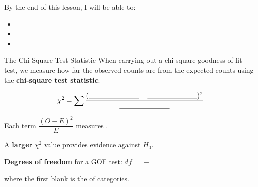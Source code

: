 \documentclass[10pt]{article}
\begin{document}
\namedateperiod

\begin{objectivebox}
By the end of this lesson, I will be able to:
\begin{itemize}
    \item[$\square$] \writeline
    \item[$\square$] \writeline
    \item[$\square$] \writeline
\end{itemize}
\end{objectivebox}

\begin{vocabbox}
\end{vocabbox}

\begin{notesbox}{The Chi-Square Test Statistic}
When carrying out a chi-square goodness-of-fit test, we measure how far the observed
counts are from the expected counts using the \textbf{chi-square test statistic}:

\vspace{0.1in}
\[
    \chi^2 = \sum \frac{(\text{\blank{2.5cm}} - \text{\blank{2.5cm}})^2}{\text{\blank{2.5cm}}}
\]

\vspace{0.05in}
Each term $\dfrac{(O-E)^2}{E}$ measures \blank{8cm}.

\vspace{0.1in}
A \textbf{larger} $\chi^2$ value provides \blank{4cm} evidence against $H_0$.

\vspace{0.1in}
\textbf{Degrees of freedom} for a GOF test: \quad $df = $ \blank{2cm} $-$ \blank{2cm}

where the first blank is the \blank{4cm} of categories.
\end{notesbox}
\end{document}
